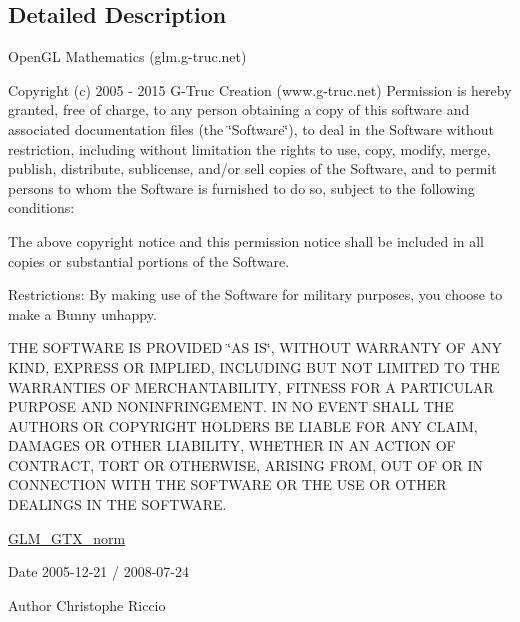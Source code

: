 \subsection{Detailed Description}
Open\-G\-L Mathematics (glm.\-g-\/truc.\-net)

Copyright (c) 2005 -\/ 2015 G-\/\-Truc Creation (www.\-g-\/truc.\-net) Permission is hereby granted, free of charge, to any person obtaining a copy of this software and associated documentation files (the \char`\"{}\-Software\char`\"{}), to deal in the Software without restriction, including without limitation the rights to use, copy, modify, merge, publish, distribute, sublicense, and/or sell copies of the Software, and to permit persons to whom the Software is furnished to do so, subject to the following conditions\-:

The above copyright notice and this permission notice shall be included in all copies or substantial portions of the Software.

Restrictions\-: By making use of the Software for military purposes, you choose to make a Bunny unhappy.

T\-H\-E S\-O\-F\-T\-W\-A\-R\-E I\-S P\-R\-O\-V\-I\-D\-E\-D \char`\"{}\-A\-S I\-S\char`\"{}, W\-I\-T\-H\-O\-U\-T W\-A\-R\-R\-A\-N\-T\-Y O\-F A\-N\-Y K\-I\-N\-D, E\-X\-P\-R\-E\-S\-S O\-R I\-M\-P\-L\-I\-E\-D, I\-N\-C\-L\-U\-D\-I\-N\-G B\-U\-T N\-O\-T L\-I\-M\-I\-T\-E\-D T\-O T\-H\-E W\-A\-R\-R\-A\-N\-T\-I\-E\-S O\-F M\-E\-R\-C\-H\-A\-N\-T\-A\-B\-I\-L\-I\-T\-Y, F\-I\-T\-N\-E\-S\-S F\-O\-R A P\-A\-R\-T\-I\-C\-U\-L\-A\-R P\-U\-R\-P\-O\-S\-E A\-N\-D N\-O\-N\-I\-N\-F\-R\-I\-N\-G\-E\-M\-E\-N\-T. I\-N N\-O E\-V\-E\-N\-T S\-H\-A\-L\-L T\-H\-E A\-U\-T\-H\-O\-R\-S O\-R C\-O\-P\-Y\-R\-I\-G\-H\-T H\-O\-L\-D\-E\-R\-S B\-E L\-I\-A\-B\-L\-E F\-O\-R A\-N\-Y C\-L\-A\-I\-M, D\-A\-M\-A\-G\-E\-S O\-R O\-T\-H\-E\-R L\-I\-A\-B\-I\-L\-I\-T\-Y, W\-H\-E\-T\-H\-E\-R I\-N A\-N A\-C\-T\-I\-O\-N O\-F C\-O\-N\-T\-R\-A\-C\-T, T\-O\-R\-T O\-R O\-T\-H\-E\-R\-W\-I\-S\-E, A\-R\-I\-S\-I\-N\-G F\-R\-O\-M, O\-U\-T O\-F O\-R I\-N C\-O\-N\-N\-E\-C\-T\-I\-O\-N W\-I\-T\-H T\-H\-E S\-O\-F\-T\-W\-A\-R\-E O\-R T\-H\-E U\-S\-E O\-R O\-T\-H\-E\-R D\-E\-A\-L\-I\-N\-G\-S I\-N T\-H\-E S\-O\-F\-T\-W\-A\-R\-E.

\hyperlink{group__gtx__norm}{G\-L\-M\-\_\-\-G\-T\-X\-\_\-norm}

\begin{DoxyDate}{Date}
2005-\/12-\/21 / 2008-\/07-\/24 
\end{DoxyDate}
\begin{DoxyAuthor}{Author}
Christophe Riccio 
\end{DoxyAuthor}
